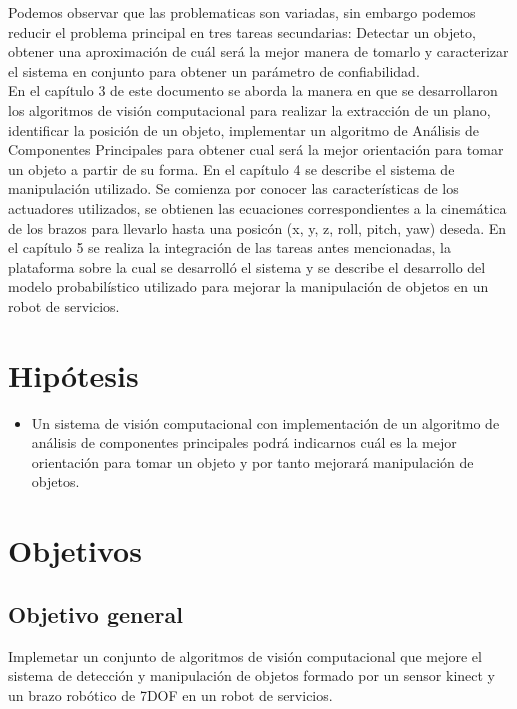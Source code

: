 		Podemos observar que las problematicas son variadas, sin embargo podemos reducir el problema principal en tres tareas secundarias: Detectar un objeto, obtener una aproximación de cuál será la mejor manera de tomarlo y caracterizar el sistema en conjunto para obtener un parámetro de confiabilidad.\\

		En el capítulo 3 de este documento se aborda la manera en que se desarrollaron los algoritmos de visión computacional para realizar la extracción de un plano, identificar la posición de un objeto, implementar un algoritmo de Análisis de Componentes Principales para obtener cual será la mejor orientación para tomar un objeto a partir de su forma. En el capítulo 4 se describe el sistema de manipulación utilizado. Se comienza por conocer las características de los actuadores utilizados, se obtienen las ecuaciones correspondientes a la cinemática de los brazos para llevarlo hasta una posicón (x, y, z, roll, pitch, yaw) deseda. En el capítulo 5 se realiza la integración de las tareas antes mencionadas, la plataforma sobre la cual se desarrolló el sistema y se describe el desarrollo del modelo probabilístico utilizado para mejorar la manipulación de objetos en un robot de servicios.\\


	\section{Hipótesis}
		\begin{itemize}

			\item Un sistema de visión computacional con implementación de un algoritmo de análisis de componentes principales podrá indicarnos cuál es la mejor orientación para tomar un objeto y por tanto mejorará manipulación de objetos.\\

		\end{itemize}

	\section{Objetivos}
		\subsection*{Objetivo general}
			Implemetar un conjunto de algoritmos de visión computacional que mejore el sistema de detección y manipulación de objetos formado por un sensor kinect y un brazo robótico de 7DOF en un robot de servicios.
